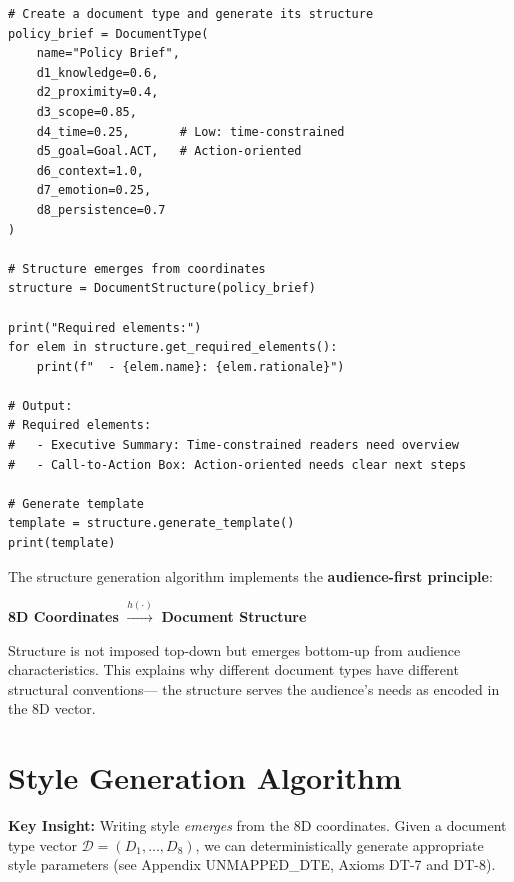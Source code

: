 \begin{verbatim}
# Create a document type and generate its structure
policy_brief = DocumentType(
    name="Policy Brief",
    d1_knowledge=0.6,
    d2_proximity=0.4,
    d3_scope=0.85,
    d4_time=0.25,       # Low: time-constrained
    d5_goal=Goal.ACT,   # Action-oriented
    d6_context=1.0,
    d7_emotion=0.25,
    d8_persistence=0.7
)

# Structure emerges from coordinates
structure = DocumentStructure(policy_brief)

print("Required elements:")
for elem in structure.get_required_elements():
    print(f"  - {elem.name}: {elem.rationale}")

# Output:
# Required elements:
#   - Executive Summary: Time-constrained readers need overview
#   - Call-to-Action Box: Action-oriented needs clear next steps

# Generate template
template = structure.generate_template()
print(template)
\end{verbatim}

\begin{tcolorbox}[colback=yellow!5!white, colframe=yellow!75!black,
    title=Key Insight: Emergent Structure]

The structure generation algorithm implements the \textbf{audience-first principle}:

\begin{center}
\textbf{8D Coordinates} $\xrightarrow{h(\cdot)}$ \textbf{Document Structure}
\end{center}

Structure is not imposed top-down but emerges bottom-up from audience characteristics.
This explains why different document types have different structural conventions---
the structure serves the audience's needs as encoded in the 8D vector.

\end{tcolorbox}


\section{Style Generation Algorithm}
\label{sec:doctype-style}

\textbf{Key Insight:} Writing style \textit{emerges} from the 8D coordinates.
Given a document type vector $\mathcal{D} = (D_1, ..., D_8)$, we can deterministically
generate appropriate style parameters (see Appendix UNMAPPED_DTE, Axioms DT-7 and DT-8).

